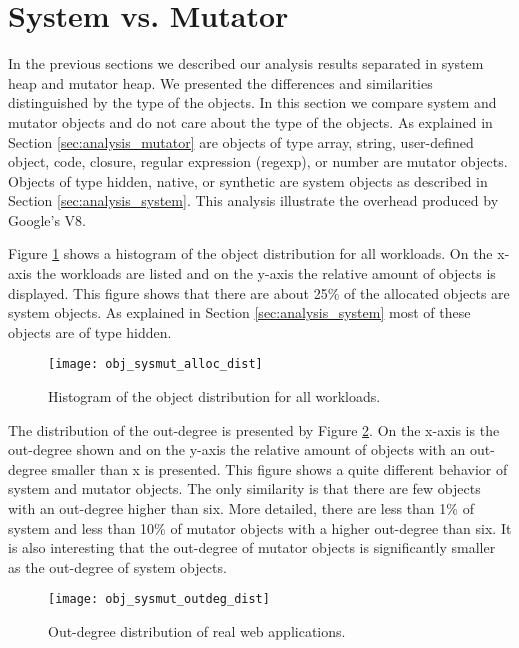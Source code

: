 
\section{System vs. Mutator} \label{sec:analysis_sys_vs_mut}

In the previous sections we described our analysis results separated in system heap and mutator heap. We presented the differences and similarities distinguished by the type of the objects. In this section we compare system and mutator objects and do not care about the type of the objects. As explained in Section \ref{sec:analysis_mutator} are objects of type array, string, user-defined object, code, closure, regular expression (regexp), or number are mutator objects. Objects of type hidden, native, or synthetic are system objects as described in Section \ref{sec:analysis_system}. This analysis illustrate the overhead produced by Google's V8. 

Figure \ref{fig:obj_sysmut_alloc_dist} shows a histogram of the object distribution for all workloads. On the x-axis the workloads are listed and on the y-axis the relative amount of objects is displayed. This figure shows that there are about 25\% of the allocated objects are system objects. As explained in Section \ref{sec:analysis_system} most of these objects are of type hidden. 
\begin{figure}
	\centering
	\texttt{[image: obj\_sysmut\_alloc\_dist]}
	\caption{Histogram of the object distribution for all workloads.}
	\label{fig:obj_sysmut_alloc_dist}
\end{figure}

The distribution of the out-degree is presented by Figure \ref{fig:obj_sysmut_outdeg_dist}. On the x-axis is the out-degree shown and on the y-axis the relative amount of objects with an out-degree smaller than x is presented. This figure shows a quite different behavior of system and mutator objects. The only similarity is that there are few objects with an out-degree higher than six. More detailed, there are less than 1\% of system and less than 10\% of mutator objects with a higher out-degree than six. It is also interesting that the out-degree of mutator objects is significantly smaller as the out-degree of system objects.
\begin{figure}
	\centering
	\texttt{[image: obj\_sysmut\_outdeg\_dist]}
	\caption{Out-degree distribution of real web applications.}
	\label{fig:obj_sysmut_outdeg_dist}
\end{figure}

